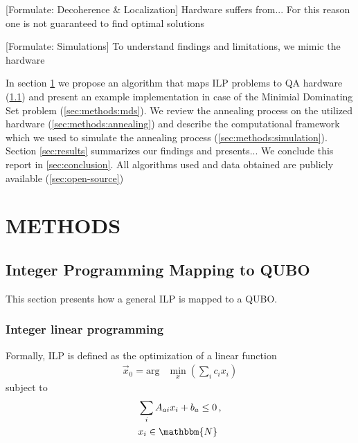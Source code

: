 \documentclass[prd,twocolumn,tightenlines,preprintnumbers,showpacs,superscriptaddress,notitlepage,nofootinbib,eqsecnum,floatfix,longbibliography]{revtex4}
\begin{document}
\alert{[Formulate: Decoherence \& Localization]}
Hardware suffers from...
For this reason one is not guaranteed to find optimal solutions

\alert{[Formulate: Simulations]}
To understand findings and limitations, we mimic the hardware 

In section \ref{sec:methods} we propose an algorithm that maps ILP problems to QA hardware (\ref{sec:methods:ilp}) and present an example implementation in case of the Minimial Dominating Set problem (\ref{sec:methods:mds}).
We review the annealing process on the utilized hardware (\ref{sec:methods:annealing}) and describe the computational framework which we used to simulate the annealing process (\ref{sec:methods:simulation}).
Section \ref{sec:results} summarizes our findings and presents...
We conclude this report in \ref{sec:conclusion}.
All algorithms used and data obtained are publicly available (\ref{sec:open-source})




\section{METHODS}
\label{sec:methods}

\subsection{Integer Programming Mapping to QUBO}
\label{sec:methods:ilp}

This section presents how a general ILP is mapped to a QUBO.

\subsubsection{Integer linear programming}
\label{sec:methods:ilp-def}
Formally, ILP is defined as the optimization of a linear function
\begin{align}
    \label{eq:initial-ip-def}
    \vec x_0 = \mathrm{arg} &\min\limits_{x}(\sum_i c_i x_i)
\end{align}
subject to
\begin{align}
    \label{eq:ilp-constraints}
    &\sum_i A_{ai}x_i +b_a \leq 0 \,,\\
    & x_i  \in \mathbbm{N}
\end{align}
\end{document}
